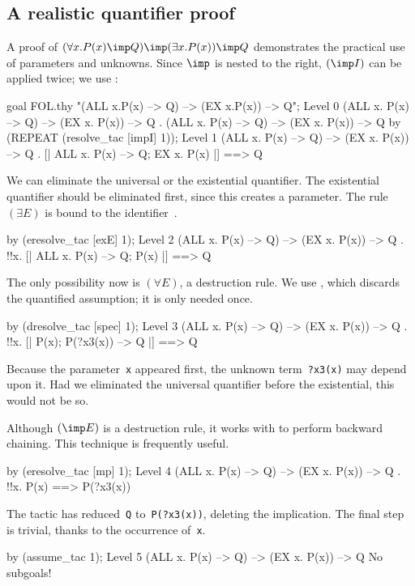 \subsection{A realistic quantifier proof}
A proof of $(\forall x. P(x) \imp Q) \imp (\exists x. P(x)) \imp Q$
demonstrates the practical use of parameters and unknowns. 
Since $\imp$ is nested to the right, $({\imp}I)$ can be applied twice; we
use :
\begin{ttbox}
goal FOL.thy "(ALL x.P(x) --> Q) --> (EX x.P(x)) --> Q";
{\out Level 0}
{\out (ALL x. P(x) --> Q) --> (EX x. P(x)) --> Q}
{. (ALL x. P(x) --> Q) --> (EX x. P(x)) --> Q}
\ttbreak
by (REPEAT (resolve_tac [impI] 1));
{\out Level 1}
{\out (ALL x. P(x) --> Q) --> (EX x. P(x)) --> Q}
{. [| ALL x. P(x) --> Q; EX x. P(x) |] ==> Q}
\end{ttbox}
We can eliminate the universal or the existential quantifier.  The
existential quantifier should be eliminated first, since this creates a
parameter.  The rule~$(\exists E)$ is bound to the
identifier~.
\begin{ttbox}
by (eresolve_tac [exE] 1);
{\out Level 2}
{\out (ALL x. P(x) --> Q) --> (EX x. P(x)) --> Q}
{. !!x. [| ALL x. P(x) --> Q; P(x) |] ==> Q}
\end{ttbox}
The only possibility now is $(\forall E)$, a destruction rule.  We use 
, which discards the quantified assumption; it is
only needed once.
\begin{ttbox}
by (dresolve_tac [spec] 1);
{\out Level 3}
{\out (ALL x. P(x) --> Q) --> (EX x. P(x)) --> Q}
{. !!x. [| P(x); P(?x3(x)) --> Q |] ==> Q}
\end{ttbox}
Because the parameter~{\tt x} appeared first, the unknown
term~{\tt?x3(x)} may depend upon it.  Had we eliminated the universal
quantifier before the existential, this would not be so.

Although $({\imp}E)$ is a destruction rule, it works with 
 to perform backward chaining.  This technique is
frequently useful.  
\begin{ttbox}
by (eresolve_tac [mp] 1);
{\out Level 4}
{\out (ALL x. P(x) --> Q) --> (EX x. P(x)) --> Q}
{. !!x. P(x) ==> P(?x3(x))}
\end{ttbox}
The tactic has reduced~{\tt Q} to~{\tt P(?x3(x))}, deleting the
implication.  The final step is trivial, thanks to the occurrence of~{\tt x}.
\begin{ttbox}
by (assume_tac 1);
{\out Level 5}
{\out (ALL x. P(x) --> Q) --> (EX x. P(x)) --> Q}
{\out No subgoals!}
\end{ttbox}


